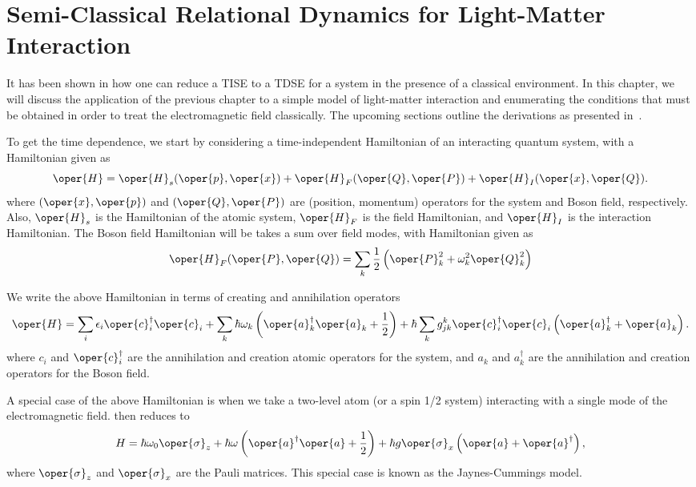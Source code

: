 \chapter{Semi-Classical Relational Dynamics for Light-Matter Interaction
\label{chap:braun_briggs_jaynes}}

It has been shown in  how one can reduce a TISE 
to a TDSE for a system in the presence of a classical environment. In this chapter, 
we will discuss the application of the previous chapter to a simple model of light-matter 
interaction and enumerating the conditions that must be obtained in order to treat the 
electromagnetic field classically. The upcoming sections outline the derivations as presented 
in~\cite{braun2004classical}. 

To get the time dependence, we start by considering a time-independent Hamiltonian of an interacting quantum system,
with a Hamiltonian given as
\begin{equation}
    \oper{H} = \oper{H}_s(\oper{p}, \oper{x}) + \oper{H}_F(\oper{Q}, \oper{P}) + \oper{H}_I(\oper{x}, \oper{Q}). 
\end{equation}
where $(\oper{x}, \oper{p})$ and $(\oper{Q}, \oper{P})$ are (position, momentum) operators for the system and Boson field, respectively. 
Also, $\oper{H}_s$ is the Hamiltonian of the atomic system, $\oper{H}_F$ is the field Hamiltonian, and $\oper{H}_I$ is the interaction Hamiltonian. 
The Boson field Hamiltonian will be takes a sum over field modes, with Hamiltonian given as 
\begin{equation}
   \oper{H}_F(\oper{P}, \oper{Q}) = \sum_{k} \frac{1}{2}\left(\oper{P}_k ^2 + \omega_k^2 \oper{Q}_k^2\right)
\end{equation}

We write the above Hamiltonian in terms of creating and annihilation operators
\begin{equation}
    \label{eq:class_jcm_eq1}
    \oper{H} = \sum_i \epsilon_i \oper{c}^\dagger _i \oper{c}_i + \sum_k \hbar \omega_k \left(\oper{a}^\dagger _k \oper{a}_k 
    + \frac{1}{2}\right) + \hbar\sum_k  g_{jk}^k \oper{c}^\dagger _i \oper{c}_i\left(\oper{a}^\dagger _k + \oper{a}_k \right).
\end{equation}
where $c_i$ and $\oper{c}^\dagger _i$ are the annihilation and creation atomic operators for the system, 
and $a_k$ and $a^\dagger _k$ are the annihilation and creation operators for the Boson field.

A special case of the above Hamiltonian is when we take a two-level atom (or a spin 1/2 system)
interacting with a single mode of the electromagnetic field.  then reduces to
\begin{eqnarray}
    \label{eq:class_jcm_eq2}
    H = {\hbar \omega_0}\oper{\sigma}_z + \hbar \omega \left(\oper{a}^\dagger \oper{a} + \frac{1}{2}\right) 
    + \hbar g \oper{\sigma}_x\left(\oper{a} + \oper{a}^\dagger\right),
\end{eqnarray}
where $\oper{\sigma}_z$ and $\oper{\sigma}_x$ are the Pauli matrices. 
This special case is known as the Jaynes-Cummings model.
